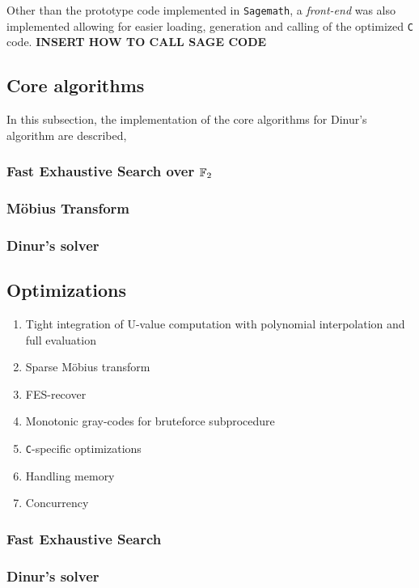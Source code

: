 Other than the prototype code implemented in \texttt{Sagemath}, a \textit{front-end} was also implemented allowing for easier loading, generation and calling of the optimized \texttt{C} code. \textbf{INSERT HOW TO CALL SAGE CODE}

\subsection{Core algorithms}

In this subsection, the implementation of the core algorithms for Dinur's algorithm are described, 

\subsubsection{Fast Exhaustive Search over $\mathbb{F}_2$}

\subsubsection{Möbius Transform}

\subsubsection{Dinur's solver}

\subsection{Optimizations}

\begin{enumerate}
    \item Tight integration of U-value computation with polynomial interpolation and full evaluation
    \item Sparse Möbius transform
    \item FES-recover
    \item Monotonic gray-codes for bruteforce subprocedure
    \item \texttt{C}-specific optimizations
    \item Handling memory
    \item Concurrency
\end{enumerate}

\subsubsection{Fast Exhaustive Search}

\subsubsection{Dinur's solver}

\newpage